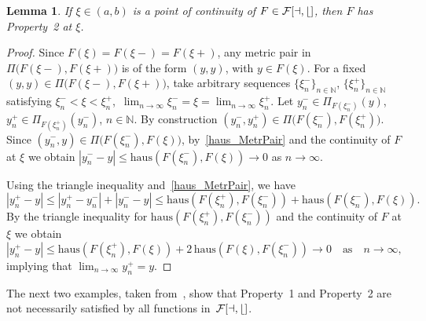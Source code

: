 \documentclass[final,3p,mathptmx]{article}%
\newcommand{\N}{{\mathbb N}}
\newcommand{\haus}{\mathrm{haus}}
\newcommand{\PrjXonY}[2]{\Pi_{#2}{(#1)} }
\newcommand{\Pair}[2]{\Pi \big ( {#1},{#2} \big )}
\newcommand{\calF}{\cal{F}[a,b]}
\newtheorem{lemma}[remark]{Lemma}
\begin{document}
{{{{\begin{lemma}\label{Lemma_ContImpliesProp2}
 If $\xi \in (a,b)$ is a point of continuity of $F \in \calF$, then $F$ has Property~2 at $\xi$.
\end{lemma}

\begin{proof}
	Since $	F(\xi) = F(\xi-)=F(\xi+)$, any metric pair in $\Pair{F(\xi-)}{F(\xi+)}$ is of the form $(y,y)$, 
	with $y\in F(\xi)$. For a fixed $(y,y) \in \Pair{F(\xi-)}{F(\xi+)}$, take arbitrary sequences $\{\xi_n^-\}_{n \in \N}$, $\{\xi_n^+\}_{n \in \N}$ satisfying $\xi_n^- < \xi < \xi_n^+$,\, 
	$\lim_{n \to \infty} \xi_n^- = \xi = \lim_{n \to \infty} \xi_n^+$. 
	Let $y_n^- \in \PrjXonY{y}{F(\xi_n^-)}$, $y_n^+ \in \PrjXonY{y_n^-}{F(\xi_n^+)}$, $n\in \N$. 
	By construction $ (y_n^-, y_n^+) \in \Pair{F(\xi_n^-)}{F(\xi_n^+)} $.
Since $ (y_n^-, y) \in \Pair{F(\xi_n^-)}{F(\xi)}$, by~\eqref{haus_MetrPair} and the continuity of $F$ at $\xi$ we obtain
$|y_n^- - y| \le \haus( F(\xi_n^-) , F(\xi) ) \to 0$ as $n\to \infty$.

Using the triangle inequality and~\eqref{haus_MetrPair}, we have
$$
|y_n^+ - y| \le |y_n^+ - y_n^- | + |y_n^- - y| \le \haus( F(\xi_n^+) , F(\xi_n^-)) + \haus( F(\xi_n^-) , F(\xi)).
$$
By the triangle inequality for $\haus( F(\xi_n^+) , F(\xi_n^-))$ and the continuity of $F$ at $\xi$ we obtain
$$
|y_n^+ - y| \le \haus( F(\xi_n^+) , F(\xi)) +  2 \, \haus(F(\xi),  F(\xi_n^-)) \to 0 \quad \text{as} \quad n\to \infty,
$$
implying that $\lim_{n \to \infty} y_n^+ = y$.

		
\end{proof}

The next two examples, taken from~\cite[Section~7]{BDFM:2021}, show that Property~1 and Property~2 are not 
necessarily satisfied by all functions in~$\calF$.

}}}}
\end{document}
